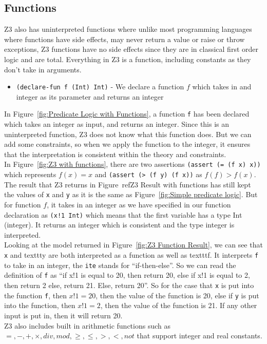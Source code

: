 \documentclass[a4paper]{report}
\begin{document}
\subsection{Functions}
Z3 also has uninterpreted functions where unlike most programming languages where functions have side effects, may never return a value or raise or throw exceptions, Z3 functions have no side effects since they are in classical first order logic and are total.
Everything in Z3 is a function, including constants as they don’t take in arguments.
\begin{itemize}
\item \texttt{(declare-fun f (Int) Int)} - We declare a function $f$ which takes in and integer as its parameter and returns an integer
\end{itemize}
In Figure~\ref{fig:Predicate Logic with Functions}, a function \texttt{f} has been declared which takes an integer as input, and returns an integer. Since this is an uninterpreted function, Z3 does not know what this function does. But we can add some constraints, so when we apply the function to the integer, it ensures that the interpretation is consistent within the theory and constraints. \\
In Figure~\ref{fig:Z3 with functions}, there are two assertions \texttt{(assert (= (f x) x))} which represents $f(x) = x$ and \texttt{(assert (> (f y) (f x))} as $f(f) > f(x)$. The result that Z3 returns in Figure~ref{Z3 Result with functions} has still kept the values of \texttt{x} and \texttt{y} as it is the same as Figure~\ref{fig:Simple predicate logic}. But for function $f$, it takes in an integer as we have specified in our function declaration as \texttt{(x!1 Int)} which means that the first variable has a type Int (integer). It returns an integer which is consistent and the type integer is interpreted. \\
Looking at the model returned in Figure~\ref{fig:Z3 Function Result}, we can see that \texttt{x} and texttt{y} are both interpreted as a function as well as texttt{f}. It interprets \texttt{f} to take in an integer, the \texttt{ite} stands for “if-then-else”. So we can read the definition of \texttt{f} as “if x!1 is equal to 20, then return 20, else if x!1 is equal to 2, then return 2 else, return 21. Else, return 20”. So for the case that \texttt{x} is put into the function \texttt{f}, then $x!1 = 20$, then the value of the function is 20, else if \texttt{y} is put into the function, then $x!1 = 2$, then the value of the function is 21. If any other input is put in, then it will return 20. \\
Z3 also includes built in arithmetic functions such as $=, -, +, \times, div, mod, \geq, \leq, >, <, not$ that support integer and real constants. \\
\end{document}
